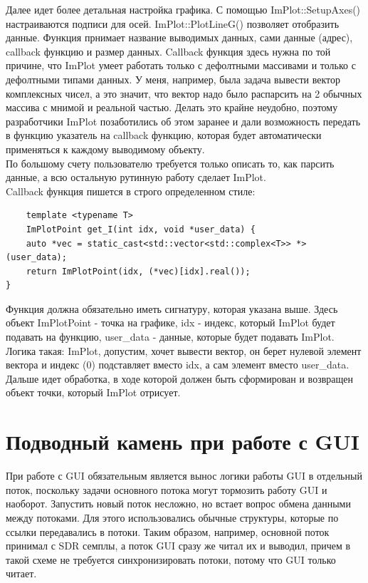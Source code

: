 Далее идет более детальная настройка графика. С помощью ImPlot::SetupAxes() настраиваются подписи для осей. ImPlot::PlotLineG() позволяет
отобразить данные. Функция прнимает название выводимых данных, сами данные (адрес), callback функцию и размер данных. Callback функция
здесь нужна по той причине, что ImPlot умеет работать только с дефолтными массивами и только с дефолтными типами данных. У меня, например,
была задача вывести вектор комплексных чисел, а это значит, что вектор надо было распарсить на 2 обычных массива с мнимой и реальной
частью. Делать это крайне неудобно, поэтому разработчики ImPlot позаботились об этом заранее и дали возможность передать в функцию
указатель на callback функцию, которая будет автоматически применяться к каждому выводимому объекту. \\

По большому счету пользователю требуется только описать то, как парсить данные, а всю остальную рутинную работу сделает ImPlot.\\

Callback функция пишется в строго определенном стиле:

\begin{lstlisting}
    template <typename T> 
    ImPlotPoint get_I(int idx, void *user_data) {
    auto *vec = static_cast<std::vector<std::complex<T>> *>(user_data);
    return ImPlotPoint(idx, (*vec)[idx].real());
}
\end{lstlisting}

Функция должна обязательно иметь сигнатуру, которая указана выше. Здесь объект ImPlotPoint - точка на графике, idx - индекс, который
ImPlot будет подавать на функцию, user\_data - данные, которые будет подавать ImPlot. Логика такая: ImPlot, допустим, хочет вывести
вектор, он берет нулевой элемент вектора и индекс (0) подставляет вместо idx, а сам элемент вместо user\_data. Дальше идет обработка,
в ходе которой должен быть сформирован и возвращен объект точки, который ImPlot отрисует.


\section{Подводный камень при работе с GUI}
При работе с GUI обязательным является вынос логики работы GUI в отдельный поток, поскольку задачи основного потока могут тормозить
работу GUI и наоборот. Запустить новый поток несложно, но встает вопрос обмена данными между потоками. Для этого использовались 
обычные структуры, которые по ссылки передавались в потоки. Таким образом, например, основной поток принимал с SDR семплы, а 
поток GUI сразу же читал их и выводил, причем в такой схеме не требуется синхронизировать потоки, потому что GUI только читает.

